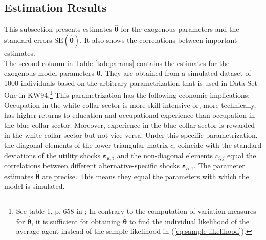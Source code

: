 \subsection{Estimation Results}
This subsection presents estimates $\pmb{\hat{\theta}}$ for the exogenous parameters and the standard errors $\text{SE}(\pmb{\hat{\theta}})$. It also shows the correlations between important estimates.\\
\newline
The second column in Table \ref{tab:params} contains the estimates for the exogenous model parameters $\pmb{\theta}$. They are obtained from a simulated dataset of 1000 individuals based on the arbitrary parametrization that is used in Data Set One in KW94.\footnote{See table 1, p. 658 in \cite{Keane.1994}; In contrary to the computation of variation measures for $\pmb{\hat{\theta}}$, it is sufficient for obtaining $\pmb{\hat{\theta}}$ to find the individual likelihood of the average agent instead of the sample likelihood in (\ref{eq:sample-likelihood}).}
This parametrization has the following economic implications: Occupation in the white-collar sector is more skill-intensive or, more technically, has higher returns to education and occupational experience than occupation in the blue-collar sector. Moreover, experience in the blue-collar sector is rewarded in the white-collar sector but not vice versa.
Under this specific parametrization, the diagonal elements of the lower triangular matrix $c_{i}$ coincide with the standard deviations of the utility shocks $\pmb{\varepsilon_{a,t}}$ and the non-diagonal elements $c_{i,j}$ equal the correlations between different alternative-specific shocks $\pmb{\varepsilon_{a,t}}$.
The parameter estimates $\pmb{\hat{\theta}}$ are precise. This means they equal the parameters with which the model is simulated.

